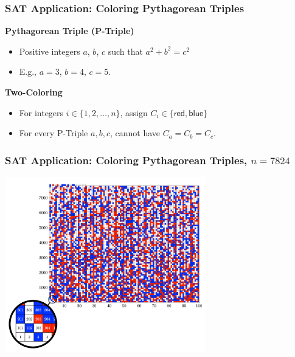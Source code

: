\documentclass[t,pdf]{beamer}
\begin{document}
\begin{frame}
\frametitle{SAT Application: Coloring Pythagorean Triples}

{\bf Pythagorean Triple (P-Triple)}
\begin{itemize}
\item Positive integers $a$, $b$, $c$ such that $a^2 + b^2 = c^2$
\item E.g., $a=3$, $b=4$, $c=5$.
\end{itemize}

{\bf Two-Coloring}
\begin{itemize}
\item For integers $i \in \{1, 2, \ldots, n\}$, assign $C_i \in \{\textsf{red}, \textsf{blue}\}$
\item For every P-Triple $a, b, c$, cannot have $C_a = C_b = C_c$.
\end{itemize}


\end{frame}


\begin{frame}
\frametitle{SAT Application: Coloring Pythagorean Triples, $n=7824$}

\begin{center}
  \includegraphics[height=3in]{figs/triple7824}
\end{center}

\end{frame}
\end{document}
